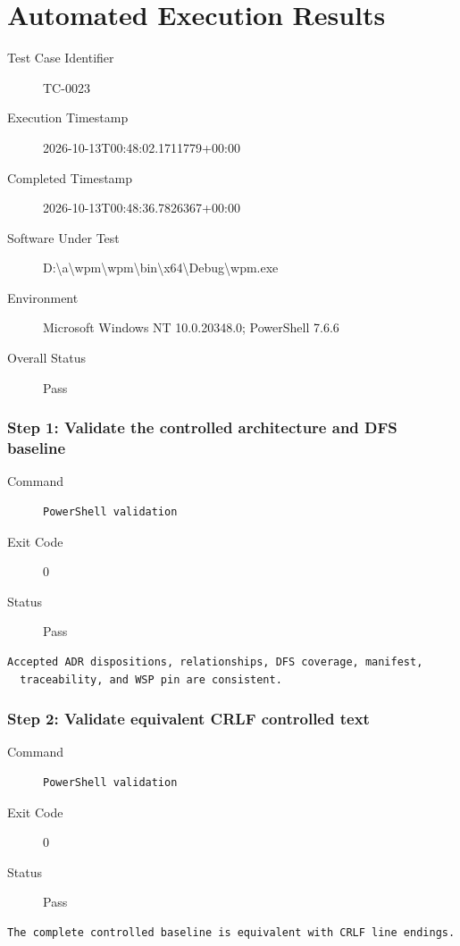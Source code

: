 \section*{Automated Execution Results}
\begin{description}
\item[Test Case Identifier] TC-0023
\item[Execution Timestamp] 2026-10-13T00:48:02.1711779+00:00
\item[Completed Timestamp] 2026-10-13T00:48:36.7826367+00:00
\item[Software Under Test] D:\textbackslash{}a\textbackslash{}wpm\textbackslash{}wpm\textbackslash{}bin\textbackslash{}x64\textbackslash{}Debug\textbackslash{}wpm.exe
\item[Environment] Microsoft Windows NT 10.0.20348.0; PowerShell 7.6.6
\item[Overall Status] Pass
\end{description}
\subsubsection*{Step 1: Validate the controlled architecture and DFS baseline}
\begin{description}
\item[Command] \mbox{}
\begin{verbatim}
PowerShell validation
\end{verbatim}
\item[Exit Code] 0
\item[Status] Pass
\end{description}
\begin{verbatim}
Accepted ADR dispositions, relationships, DFS coverage, manifest,
  traceability, and WSP pin are consistent.
\end{verbatim}
\subsubsection*{Step 2: Validate equivalent CRLF controlled text}
\begin{description}
\item[Command] \mbox{}
\begin{verbatim}
PowerShell validation
\end{verbatim}
\item[Exit Code] 0
\item[Status] Pass
\end{description}
\begin{verbatim}
The complete controlled baseline is equivalent with CRLF line endings.
\end{verbatim}
